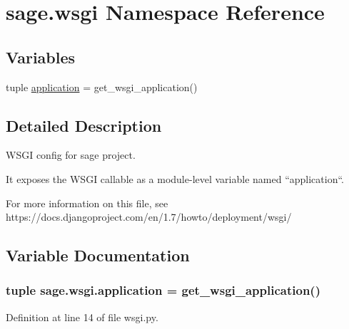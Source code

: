 \hypertarget{namespacesage_1_1wsgi}{}\section{sage.\+wsgi Namespace Reference}
\label{namespacesage_1_1wsgi}
\subsection*{Variables}
\begin{DoxyCompactItemize}
\item 
tuple \hyperlink{namespacesage_1_1wsgi_a1ddb23bace7377dbda42c61a804bb9aa}{application} = get\+\_\+wsgi\+\_\+application()
\end{DoxyCompactItemize}


\subsection{Detailed Description}
\begin{DoxyVerb}WSGI config for sage project.

It exposes the WSGI callable as a module-level variable named ``application``.

For more information on this file, see
https://docs.djangoproject.com/en/1.7/howto/deployment/wsgi/
\end{DoxyVerb}
 

\subsection{Variable Documentation}
\hypertarget{namespacesage_1_1wsgi_a1ddb23bace7377dbda42c61a804bb9aa}{}
\subsubsection[{application}]{\setlength{\rightskip}{0pt plus 5cm}tuple sage.\+wsgi.\+application = get\+\_\+wsgi\+\_\+application()}\label{namespacesage_1_1wsgi_a1ddb23bace7377dbda42c61a804bb9aa}


Definition at line 14 of file wsgi.\+py.

